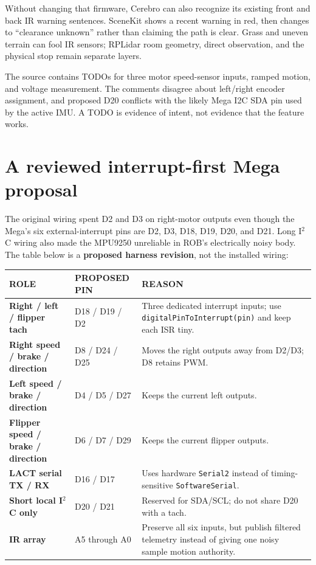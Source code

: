 \documentclass[11pt,openany]{book}
\begin{document}
Without changing that firmware, Cerebro can also recognize its existing front and back IR warning sentences. SceneKit shows a recent warning in red, then changes to ``clearance unknown'' rather than claiming the path is clear. Grass and uneven terrain can fool IR sensors; RPLidar room geometry, direct observation, and the physical stop remain separate layers.

\begin{fieldnotebox}
The source contains TODOs for three motor speed-sensor inputs, ramped motion, and voltage measurement. The comments disagree about left/right encoder assignment, and proposed D20 conflicts with the likely Mega I2C SDA pin used by the active IMU. A TODO is evidence of intent, not evidence that the feature works.
\end{fieldnotebox}

\section*{A reviewed interrupt-first Mega proposal}

The original wiring spent D2 and D3 on right-motor outputs even though the Mega's six external-interrupt pins are D2, D3, D18, D19, D20, and D21. Long I$^2$C wiring also made the MPU9250 unreliable in ROB's electrically noisy body. The table below is a \textbf{proposed harness revision}, not the installed wiring:

\begin{tabularx}{\textwidth}{>{\robcondensed\bfseries}p{1.45in} p{1.05in} X}
\toprule
ROLE & PROPOSED PIN & REASON\\
\midrule
Right / left / flipper tach & D18 / D19 / D2 & Three dedicated interrupt inputs; use \texttt{digitalPinToInterrupt(pin)} and keep each ISR tiny.\\
Right speed / brake / direction & D8 / D24 / D25 & Moves the right outputs away from D2/D3; D8 retains PWM.\\
Left speed / brake / direction & D4 / D5 / D27 & Keeps the current left outputs.\\
Flipper speed / brake / direction & D6 / D7 / D29 & Keeps the current flipper outputs.\\
LACT serial TX / RX & D16 / D17 & Uses hardware \texttt{Serial2} instead of timing-sensitive \texttt{SoftwareSerial}.\\
Short local I$^2$C only & D20 / D21 & Reserved for SDA/SCL; do not share D20 with a tach.\\
IR array & A5 through A0 & Preserve all six inputs, but publish filtered telemetry instead of giving one noisy sample motion authority.\\
\bottomrule
\end{tabularx}
\end{document}
